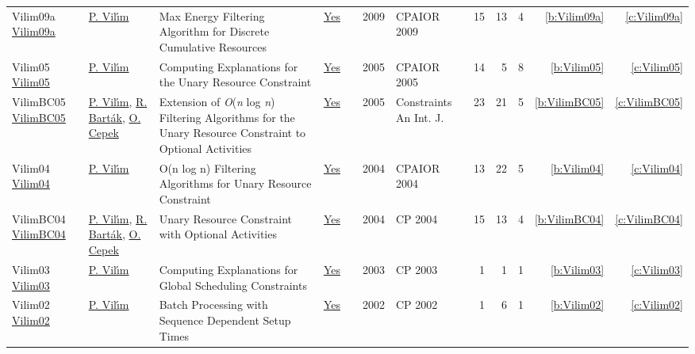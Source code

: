 {\begin{longtable}{>{\raggedright\arraybackslash}p{3cm}>{\raggedright\arraybackslash}p{6cm}>{\raggedright\arraybackslash}p{6.5cm}rrrp{2.5cm}rrrrr}
Vilim09a \href{https://doi.org/10.1007/978-3-642-01929-6\_22}{Vilim09a} & \hyperref[auth:a121]{P. Vil{\'{\i}}m} & Max Energy Filtering Algorithm for Discrete Cumulative Resources & \href{../works/Vilim09a.pdf}{Yes} & \cite{Vilim09a} & 2009 & CPAIOR 2009 & 15 & 13 & 4 & \ref{b:Vilim09a} & \ref{c:Vilim09a}\\
Vilim05 \href{https://doi.org/10.1007/11493853\_29}{Vilim05} & \hyperref[auth:a121]{P. Vil{\'{\i}}m} & Computing Explanations for the Unary Resource Constraint & \href{../works/Vilim05.pdf}{Yes} & \cite{Vilim05} & 2005 & CPAIOR 2005 & 14 & 5 & 8 & \ref{b:Vilim05} & \ref{c:Vilim05}\\
VilimBC05 \href{https://doi.org/10.1007/s10601-005-2814-0}{VilimBC05} & \hyperref[auth:a121]{P. Vil{\'{\i}}m}, \hyperref[auth:a153]{R. Bart{\'{a}}k}, \hyperref[auth:a163]{O. Cepek} & Extension of \emph{O}(\emph{n} log \emph{n}) Filtering Algorithms for the Unary Resource Constraint to Optional Activities & \href{../works/VilimBC05.pdf}{Yes} & \cite{VilimBC05} & 2005 & Constraints An Int. J. & 23 & 21 & 5 & \ref{b:VilimBC05} & \ref{c:VilimBC05}\\
Vilim04 \href{https://doi.org/10.1007/978-3-540-24664-0\_23}{Vilim04} & \hyperref[auth:a121]{P. Vil{\'{\i}}m} & O(n log n) Filtering Algorithms for Unary Resource Constraint & \href{../works/Vilim04.pdf}{Yes} & \cite{Vilim04} & 2004 & CPAIOR 2004 & 13 & 22 & 5 & \ref{b:Vilim04} & \ref{c:Vilim04}\\
VilimBC04 \href{https://doi.org/10.1007/978-3-540-30201-8\_8}{VilimBC04} & \hyperref[auth:a121]{P. Vil{\'{\i}}m}, \hyperref[auth:a153]{R. Bart{\'{a}}k}, \hyperref[auth:a163]{O. Cepek} & Unary Resource Constraint with Optional Activities & \href{../works/VilimBC04.pdf}{Yes} & \cite{VilimBC04} & 2004 & CP 2004 & 15 & 13 & 4 & \ref{b:VilimBC04} & \ref{c:VilimBC04}\\
Vilim03 \href{https://doi.org/10.1007/978-3-540-45193-8\_124}{Vilim03} & \hyperref[auth:a121]{P. Vil{\'{\i}}m} & Computing Explanations for Global Scheduling Constraints & \href{../works/Vilim03.pdf}{Yes} & \cite{Vilim03} & 2003 & CP 2003 & 1 & 1 & 1 & \ref{b:Vilim03} & \ref{c:Vilim03}\\
Vilim02 \href{https://doi.org/10.1007/3-540-46135-3\_62}{Vilim02} & \hyperref[auth:a121]{P. Vil{\'{\i}}m} & Batch Processing with Sequence Dependent Setup Times & \href{../works/Vilim02.pdf}{Yes} & \cite{Vilim02} & 2002 & CP 2002 & 1 & 6 & 1 & \ref{b:Vilim02} & \ref{c:Vilim02}\\
\end{longtable}
}

